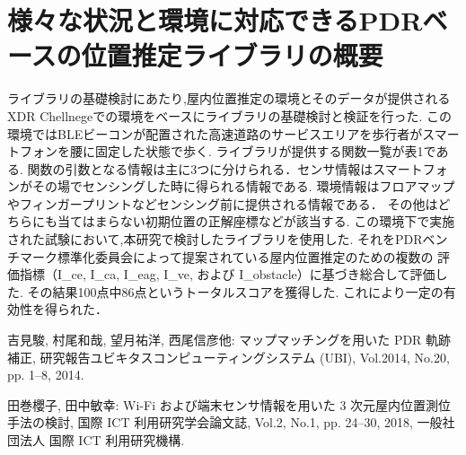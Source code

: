 \documentclass[Japanese]{abstruct}
\begin{document}
\section{様々な状況と環境に対応できるPDRベースの位置推定ライブラリの概要}
ライブラリの基礎検討にあたり,屋内位置推定の環境とそのデータが提供されるXDR Chellnegeでの環境をベースにライブラリの基礎検討と検証を行った.
この環境ではBLEビーコンが配置された高速道路のサービスエリアを歩行者がスマートフォンを腰に固定した状態で歩く.
ライブラリが提供する関数一覧が表1である.
関数の引数となる情報は主に3つに分けられる．センサ情報はスマートフォンがその場でセンシングした時に得られる情報である.
環境情報はフロアマップやフィンガープリントなどセンシング前に提供される情報である．
その他はどちらにも当てはまらない初期位置の正解座標などが該当する.
この環境下で実施された試験において,本研究で検討したライブラリを使用した.
それをPDRベンチマーク標準化委員会によって提案されている屋内位置推定のための複数の
評価指標（I\_ce, I\_ca, I\_eag, I\_ve, および I\_obstacle）に基づき総合して評価した.
その結果100点中86点というトータルスコアを獲得した.
これにより一定の有効性を得られた．

\begin{thebibliography}{2}
	吉見駿, 村尾和哉, 望月祐洋, 西尾信彦他:
	マップマッチングを用いた PDR 軌跡補正,
	研究報告ユビキタスコンピューティングシステム (UBI),
	Vol.2014, No.20, pp. 1--8, 2014.

	田巻櫻子, 田中敏幸:
	Wi-Fi および端末センサ情報を用いた 3 次元屋内位置測位手法の検討,
	国際 ICT 利用研究学会論文誌,
	Vol.2, No.1, pp. 24--30, 2018,
	一般社団法人 国際 ICT 利用研究機構.
\end{thebibliography}
\end{document}
